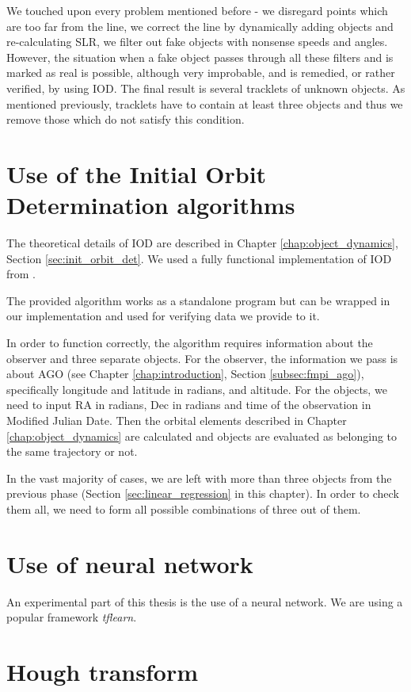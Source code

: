 	We touched upon every problem mentioned before - we disregard points which are too far from the line, we correct the line by dynamically adding objects and re-calculating SLR, we filter out fake objects with nonsense speeds and angles. However, the situation when a fake object passes through all these filters and is marked as real is possible, although very improbable, and is remedied, or rather verified, by using IOD. The final result is several tracklets of unknown objects. As mentioned previously, tracklets have to contain at least three objects and thus we remove those which do not satisfy this condition.

\section{Use of the Initial Orbit Determination algorithms}\label{sec:IDO}

	The theoretical details of IOD are described in Chapter \ref{chap:object_dynamics}, Section \ref{sec:init_orbit_det}. We used a fully functional implementation of IOD from \citep{Silha2012id}.

	The provided algorithm works as a standalone program but can be wrapped in our implementation and used for verifying data we provide to it.
	
	 In order to function correctly, the algorithm requires information about the observer and three separate objects. For the observer, the information we pass is about AGO (see Chapter \ref{chap:introduction}, Section \ref{subsec:fmpi_ago}), specifically longitude and latitude in radians, and altitude. For the objects, we need to input RA in radians, Dec in radians and time of the observation in Modified Julian Date. Then the orbital elements described in Chapter \ref{chap:object_dynamics} are calculated and objects are evaluated as belonging to the same trajectory or not.
	 
	 In the vast majority of cases, we are left with more than three objects from the previous phase (Section \ref{sec:linear_regression} in this chapter). In order to check them all, we need to form all possible combinations of three out of them.

\section{Use of neural network}\label{sec:neural}

	An experimental part of this thesis is the use of a neural network. We are using a popular framework \emph{tflearn}.

\section{Hough transform}\label{sec:hough}